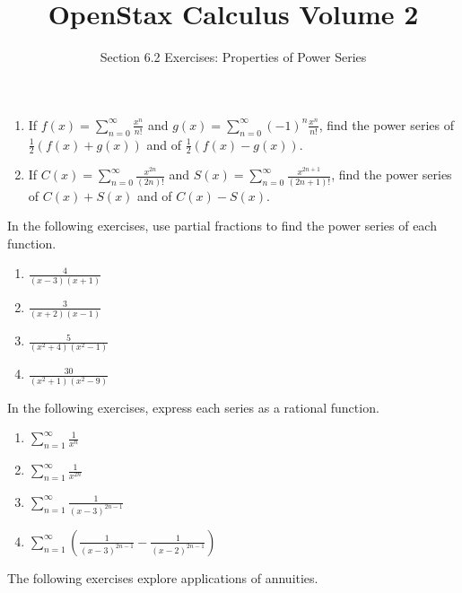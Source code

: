 \documentclass{exercises}
\title{OpenStax Calculus Volume 2}
\subtitle{Section 6.2 Exercises: Properties of Power Series}
\author{}
\date{}
\begin{document}
\maketitle

\begin{enumerate}[start=1]
\item If $f(x)=\sum_{n=0}^{\infty}\frac{x^{n}}{n!}$ and $g(x)=\sum_{n=0}^{\infty}{(-1)}^{n}\frac{x^{n}}{n!}$, find the power series of $\frac{1}{2}(f(x)+g(x))$ and of $\frac{1}{2}(f(x)-g(x))$.
\item If $C(x)=\sum_{n=0}^{\infty}\frac{x^{2n}}{(2n)!}$ and $S(x)=\sum_{n=0}^{\infty}\frac{x^{2n+1}}{(2n+1)!}$, find the power series of $C(x)+S(x)$ and of $C(x)-S(x)$.
\end{enumerate}

In the following exercises, use partial fractions to find the power series of each function.

\begin{enumerate}[resume]
\item $\frac{4}{(x-3)(x+1)}$
\item $\frac{3}{(x+2)(x-1)}$
\item $\frac{5}{(x^{2}+4)(x^{2}-1)}$
\item $\frac{30}{(x^{2}+1)(x^{2}-9)}$
\end{enumerate}

In the following exercises, express each series as a rational function.

\begin{enumerate}[resume]
\item $\sum_{n=1}^{\infty}\frac{1}{x^{n}}$
\item $\sum_{n=1}^{\infty}\frac{1}{x^{2n}}$
\item $\sum_{n=1}^{\infty}\frac{1}{{(x-3)}^{2n-1}}$
\item $\sum_{n=1}^{\infty}(\frac{1}{{(x-3)}^{2n-1}}-\frac{1}{{(x-2)}^{2n-1}})$
\end{enumerate}

The following exercises explore applications of annuities.
\end{document}

